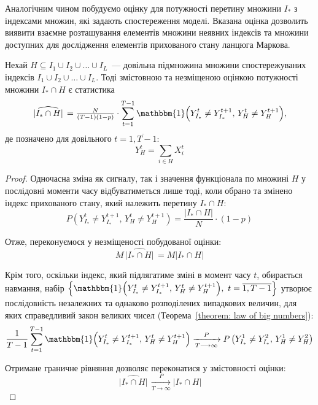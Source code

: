 Аналогічним чином побудуємо оцінку для потужності перетину множини $I_*$ з індексами множин, які задають спостереження моделі. Вказана оцінка дозволить виявити взаємне розташування елементів множини неявних індексів та множини доступних для дослідження елементів прихованого стану ланцюга Маркова.

\begin{claim}
    Нехай $H \subseteq I_1 \cup I_2 \cup \ldots \cup I_L$~--- довільна підмножина множини спостережуваних індексів $I_1 \cup I_2 \cup \ldots \cup I_L$. Тоді змістовною та незміщеною оцінкою потужності множини $I_* \cap H$ є статистика
    \begin{equation}\label{eq: ||I* cup H|| estimation}
        \widehat{\,|I_* \cap H|\,} = \tfrac{N}{(T-1)(1-p)} \cdot \sum_{t=1}^{T-1}\mathbbm{1} \Bigl( Y^t_{I_*} \neq Y^{t+1}_{I_*},\, Y^t_H \neq Y^{t+1}_H \Bigr),
    \end{equation}
    де позначено для довільного $t=\overline{1,T-1}:$ 
    \begin{equation*}
        Y^t_{H} = \sum_{i \in H} X^t_i
    \end{equation*}
\end{claim}
\begin{proof}
    Одночасна зміна як сигналу, так і значення функціонала по множині $H$ у послідовні моменти часу відбуватиметься лише тоді, коли обрано та змінено індекс прихованого стану, який належить перетину $I_* \cap H:$
    \begin{equation*}
        P\left( Y^t_{I_*} \neq Y^{t+1}_{I_*},\, Y^t_H \neq Y^{t+1}_H \right) = \frac{\left| I_* \cap H \right|}{N}\cdot (1-p)
    \end{equation*}

    Отже, переконуємося у незміщеності побудованої оцінки:
    \begin{equation*}
        M\widehat{\,|I_* \cap H|\,} = M|I_* \cap H| 
    \end{equation*}

    Крім того, оскільки індекс, який підлягатиме зміні в момент часу $t$, обирається навмання, набір $\left\{ \mathbbm{1} \Bigl( Y^t_{I_*} \neq Y^{t+1}_{I_*},\, Y^t_H \neq Y^{t+1}_H \Bigr),\ t=\overline{1,T-1} \right\}$ утворює послідовність незалежних та однаково розподілених випадкових величин, для яких справедливий закон великих чисел (Теорема~\ref{theorem: law of big numbers}):
    \begin{equation*}
        \frac{1}{T-1}\sum_{t=1}^{T-1}\mathbbm{1} \Bigl( Y^t_{I_*} \neq Y^{t+1}_{I_*},\, Y^t_H \neq Y^{t+1}_H \Bigr) \xrightarrow[T \longrightarrow \infty]{P} P\left( Y^1_{I_*} \neq Y^2_{I_*},\, Y^1_H \neq Y^2_H \right)
    \end{equation*}

    Отримане граничне рівняння дозволяє переконатися у змістовності оцінки:
    \begin{equation*}
        \widehat{\,|I_* \cap H|\,} \xrightarrow[T \longrightarrow \infty]{P} |I_* \cap H|
    \end{equation*}
\end{proof}

